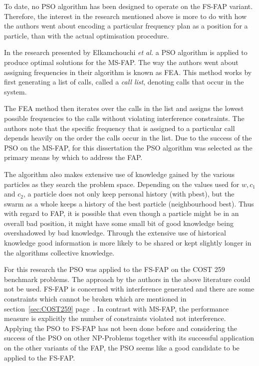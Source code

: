 To date, no \gls{PSO} algorithm has been designed to operate on the \gls{FS-FAP} variant. Therefore, the interest in the research mentioned above is more to do with how the authors went about encoding a particular frequency plan as a position for a particle, than with the actual optimisation procedure.

In the research presented by Elkamchouchi \emph{et al.}\cite{EgyptFAPPSO} a \gls{PSO} algorithm is applied to produce optimal solutions for the \gls{MS-FAP}. The way the authors went about assigning frequencies in their algorithm is known as \gls{FEA}.
This method works by first generating a list of calls, called a \emph{call list}, denoting calls that occur in the system\cite{EgyptFAPPSO}. 

The \gls{FEA} method then iterates over the calls in the list and assigns the lowest possible frequencies to the calls without violating interference constraints\cite{EgyptFAPPSO}. The authors note that the specific frequency that is assigned to a particular call depends heavily on the order the calls occur in the list\cite{EgyptFAPPSO}.
Due to the success of the \gls{PSO} on the \gls{MS-FAP}, for this dissertation the \gls{PSO} algorithm was selected as the primary means by which to address the \gls{FAP}.

The algorithm also makes extensive use of knowledge gained by the various particles as they search the problem space. Depending on the values used for $w, c_1$ and $c_2$, a particle does not only keep personal history (with pbest), but the swarm as a whole keeps a history of the best particle (neighbourhood best). Thus with regard to \gls{FAP}, it is possible that even though a particle might be in an overall bad position, it might have some small bit of good knowledge being overshadowed by bad knowledge. Through the extensive use of historical knowledge good information is more likely to be shared or kept slightly longer in the algorithms collective knowledge.

For this research the \gls{PSO} was applied to the \gls{FS-FAP} on the \gls{COST} 259 benchmark problems. The approach by the authors in the above literature could not be used. \gls{FS-FAP} is concerned with interference generated and there are some constraints which cannot be broken which are mentioned in section~\ref{sec:COST259} page~\pageref{sec:COST259}. In contrast with \gls{MS-FAP}, the performance measure is explicitly the number of constraints violated not interference. Applying the \gls{PSO} to \gls{FS-FAP} has not been done before and considering the success of the \gls{PSO} on other NP-Problems together with its successful application on the other variants of the FAP, the PSO seems like a good candidate to be applied to the \gls{FS-FAP}.

